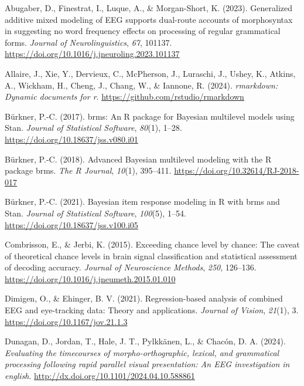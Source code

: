 \documentclass[
  doc,
  floatsintext,
  longtable,
  a4paper,
  nolmodern,
  notxfonts,
  notimes,
  colorlinks=true,linkcolor=blue,citecolor=blue,urlcolor=blue]{apa7}
\newlength{\cslhangindent}
\newenvironment{CSLReferences}[2] %
 {\begin{list}{}{%
  \setlength{\itemindent}{0pt}
  \setlength{\leftmargin}{0pt}
  \setlength{\parsep}{0pt}
  \ifodd #1
   \setlength{\leftmargin}{\cslhangindent}
   \setlength{\itemindent}{-1\cslhangindent}
  \fi
  \setlength{\itemsep}{#2\baselineskip}}}
 {\end{list}}
\begin{document}
\label{refs}
\begin{CSLReferences}{1}{0}
Abugaber, D., Finestrat, I., Luque, A., \& Morgan-Short, K. (2023).
Generalized additive mixed modeling of EEG supports dual-route accounts
of morphosyntax in suggesting no word frequency effects on processing of
regular grammatical forms. \emph{Journal of Neurolinguistics},
\emph{67}, 101137.
\url{https://doi.org/10.1016/j.jneuroling.2023.101137}

Allaire, J., Xie, Y., Dervieux, C., McPherson, J., Luraschi, J., Ushey,
K., Atkins, A., Wickham, H., Cheng, J., Chang, W., \& Iannone, R.
(2024). \emph{{rmarkdown}: Dynamic documents for r}.
\url{https://github.com/rstudio/rmarkdown}

Bürkner, P.-C. (2017). {brms}: An {R} package for {Bayesian} multilevel
models using {Stan}. \emph{Journal of Statistical Software},
\emph{80}(1), 1--28. \url{https://doi.org/10.18637/jss.v080.i01}

Bürkner, P.-C. (2018). Advanced {Bayesian} multilevel modeling with the
{R} package {brms}. \emph{The R Journal}, \emph{10}(1), 395--411.
\url{https://doi.org/10.32614/RJ-2018-017}

Bürkner, P.-C. (2021). Bayesian item response modeling in {R} with
{brms} and {Stan}. \emph{Journal of Statistical Software},
\emph{100}(5), 1--54. \url{https://doi.org/10.18637/jss.v100.i05}

Combrisson, E., \& Jerbi, K. (2015). Exceeding chance level by chance:
{The} caveat of theoretical chance levels in brain signal classification
and statistical assessment of decoding accuracy. \emph{Journal of
Neuroscience Methods}, \emph{250}, 126--136.
\url{https://doi.org/10.1016/j.jneumeth.2015.01.010}

Dimigen, O., \& Ehinger, B. V. (2021). Regression-based analysis of
combined EEG and eye-tracking data: Theory and applications.
\emph{Journal of Vision}, \emph{21}(1), 3.
\url{https://doi.org/10.1167/jov.21.1.3}

Dunagan, D., Jordan, T., Hale, J. T., Pylkkänen, L., \& Chacón, D. A.
(2024). \emph{Evaluating the timecourses of morpho-orthographic,
lexical, and grammatical processing following rapid parallel visual
presentation: An EEG investigation in english}.
\url{http://dx.doi.org/10.1101/2024.04.10.588861}


\end{CSLReferences}
\end{document}
